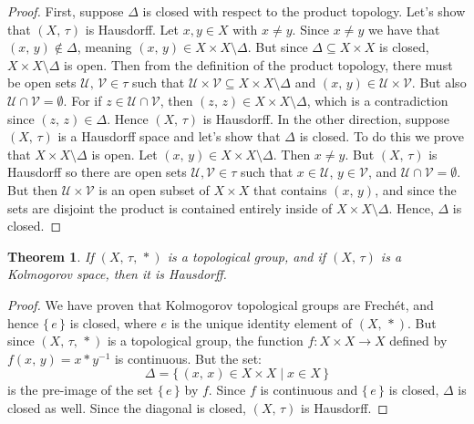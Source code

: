 \documentclass{article}
\theoremstyle{plain}
\newtheorem{theorem}{Theorem}[section]
\theoremstyle{normal}
\begin{document}
        \begin{proof}
            First, suppose $\Delta$ is closed with respect to the product
            topology. Let's show that $(X,\,\tau)$ is Hausdorff. Let
            $x,y\in{X}$ with $x\ne{y}$. Since $x\ne{y}$ we have that
            $(x,\,y)\notin\Delta$, meaning
            $(x,\,y)\in{X}\times{X}\setminus\Delta$. But since
            $\Delta\subseteq{X}\times{X}$ is closed,
            $X\times{X}\setminus\Delta$ is open. Then from the definition
            of the product topology, there must be open sets
            $\mathcal{U},\,\mathcal{V}\in\tau$ such that
            $\mathcal{U}\times\mathcal{V}\subseteq{X}\times{X}\setminus\Delta$
            and $(x,\,y)\in\mathcal{U}\times\mathcal{V}$. But also
            $\mathcal{U}\cap\mathcal{V}=\emptyset$. For if
            $z\in\mathcal{U}\cap\mathcal{V}$, then
            $(z,\,z)\in{X}\times{X}\setminus\Delta$, which is a contradiction
            since $(z,\,z)\in\Delta$. Hence $(X,\,\tau)$ is Hausdorff.
            In the other direction, suppose $(X,\,\tau)$ is a Hausdorff space
            and let's show that $\Delta$ is closed. To do this we prove that
            $X\times{X}\setminus\Delta$ is open. Let
            $(x,\,y)\in{X}\times{X}\setminus\Delta$. Then $x\ne{y}$. But
            $(X,\,\tau)$ is Hausdorff so there are open sets
            $\mathcal{U},\mathcal{V}\in\tau$ such that
            $x\in\mathcal{U}$, $y\in\mathcal{V}$, and
            $\mathcal{U}\cap\mathcal{V}=\emptyset$. But then
            $\mathcal{U}\times\mathcal{V}$ is an open subset of
            $X\times{X}$ that contains $(x,\,y)$, and since the sets are
            disjoint the product is contained entirely inside of
            $X\times{X}\setminus\Delta$. Hence, $\Delta$ is closed.
        \end{proof}
        \begin{theorem}
            If $(X,\,\tau,\,*)$ is a topological group, and if $(X,\,\tau)$
            is a Kolmogorov space, then it is Hausdorff.
        \end{theorem}
        \begin{proof}
            We have proven that Kolmogorov topological groups are Frech\'{e}t,
            and hence $\{\,e\,\}$ is closed, where $e$ is the unique identity
            element of $(X,\,*)$. But since $(X,\,\tau,\,*)$ is a
            topological group, the function $f:X\times{X}\rightarrow{X}$
            defined by $f(x,\,y)=x*y^{-1}$ is continuous. But the set:
            \begin{equation}
                \Delta=\{\,(x,\,x)\in{X}\times{X}\;|\;x\in{X}\,\}
            \end{equation}
            is the pre-image of the set $\{\,e\,\}$ by $f$. Since $f$ is
            continuous and $\{\,e\,\}$ is closed, $\Delta$ is closed as well.
            Since the diagonal is closed, $(X,\,\tau)$ is Hausdorff.
        \end{proof}
\end{document}
